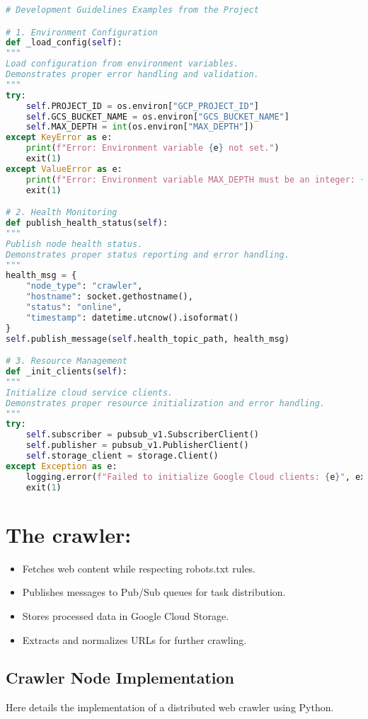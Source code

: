 \documentclass[12pt,a4paper]{report}
\begin{document}
\begin{lstlisting}[language=Python]
# Development Guidelines Examples from the Project

# 1. Environment Configuration
def _load_config(self):
"""
Load configuration from environment variables.
Demonstrates proper error handling and validation.
"""
try:
    self.PROJECT_ID = os.environ["GCP_PROJECT_ID"]
    self.GCS_BUCKET_NAME = os.environ["GCS_BUCKET_NAME"]
    self.MAX_DEPTH = int(os.environ["MAX_DEPTH"])
except KeyError as e:
    print(f"Error: Environment variable {e} not set.")
    exit(1)
except ValueError as e:
    print(f"Error: Environment variable MAX_DEPTH must be an integer: {e}")
    exit(1)

# 2. Health Monitoring
def publish_health_status(self):
"""
Publish node health status.
Demonstrates proper status reporting and error handling.
"""
health_msg = {
    "node_type": "crawler",
    "hostname": socket.gethostname(),
    "status": "online",
    "timestamp": datetime.utcnow().isoformat()
}
self.publish_message(self.health_topic_path, health_msg)

# 3. Resource Management
def _init_clients(self):
"""
Initialize cloud service clients.
Demonstrates proper resource initialization and error handling.
"""
try:
    self.subscriber = pubsub_v1.SubscriberClient()
    self.publisher = pubsub_v1.PublisherClient()
    self.storage_client = storage.Client()
except Exception as e:
    logging.error(f"Failed to initialize Google Cloud clients: {e}", exc_info=True)
    exit(1)
\end{lstlisting}


\section{The crawler:}
\begin{itemize}
    \item Fetches web content while respecting robots.txt rules.
    \item Publishes messages to Pub/Sub queues for task distribution.
    \item Stores processed data in Google Cloud Storage.
    \item Extracts and normalizes URLs for further crawling.
\end{itemize}
\subsection{Crawler Node Implementation}
Here details the implementation of a distributed web crawler using Python.
\end{document}
